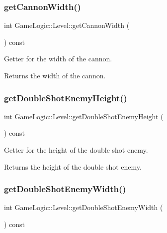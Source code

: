 \subsubsection{\texorpdfstring{get\+Cannon\+Width()}{getCannonWidth()}}
{\footnotesize\ttfamily int Game\+Logic\+::\+Level\+::get\+Cannon\+Width (\begin{DoxyParamCaption}{ }\end{DoxyParamCaption}) const}

Getter for the width of the cannon. \begin{DoxyReturn}{Returns}
the width of the cannon. 
\end{DoxyReturn}
\mbox{\label{classGameLogic_1_1Level_a3196aa721c3d7b09be321ef3bbf0c5e9}} 
\subsubsection{\texorpdfstring{get\+Double\+Shot\+Enemy\+Height()}{getDoubleShotEnemyHeight()}}
{\footnotesize\ttfamily int Game\+Logic\+::\+Level\+::get\+Double\+Shot\+Enemy\+Height (\begin{DoxyParamCaption}{ }\end{DoxyParamCaption}) const}

Getter for the height of the double shot enemy. \begin{DoxyReturn}{Returns}
the height of the double shot enemy. 
\end{DoxyReturn}
\mbox{\label{classGameLogic_1_1Level_a20cbcb471e2060a0024c5f7a055a85ce}} 
\subsubsection{\texorpdfstring{get\+Double\+Shot\+Enemy\+Width()}{getDoubleShotEnemyWidth()}}
{\footnotesize\ttfamily int Game\+Logic\+::\+Level\+::get\+Double\+Shot\+Enemy\+Width (\begin{DoxyParamCaption}{ }\end{DoxyParamCaption}) const}

